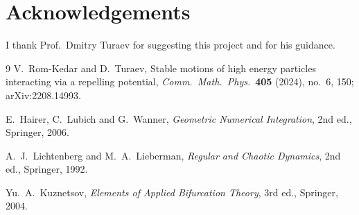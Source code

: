 \documentclass[11pt,a4paper]{article}
\begin{document}
\section*{Acknowledgements}
I thank Prof.\ Dmitry Turaev for suggesting this project and for his guidance.

\begin{thebibliography}{9}
V.~Rom-Kedar and D.~Turaev,
Stable motions of high energy particles interacting via a repelling potential,
\emph{Comm.\ Math.\ Phys.}\ \textbf{405} (2024), no.~6, 150;
arXiv:2208.14993.

E.~Hairer, C.~Lubich and G.~Wanner,
\emph{Geometric Numerical Integration}, 2nd ed., Springer, 2006.

A.~J.~Lichtenberg and M.~A.~Lieberman,
\emph{Regular and Chaotic Dynamics}, 2nd ed., Springer, 1992.

Yu.~A.~Kuznetsov, \emph{Elements of Applied Bifurcation Theory}, 3rd ed.,
Springer, 2004.
\end{thebibliography}
\end{document}
